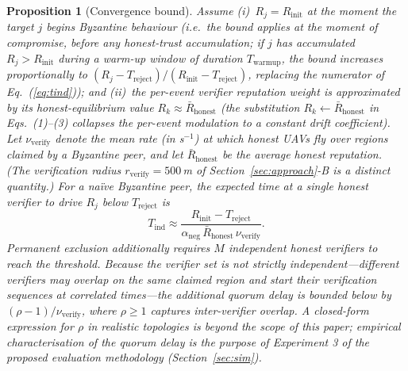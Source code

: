 \documentclass[conference,10pt]{IEEEtran}
\newtheorem{proposition}{Proposition}
\begin{document}
\begin{proposition}[Convergence bound]
\label{prop:conv}
Assume (i)~$R_j = R_\text{init}$ at the moment the target $j$ begins Byzantine behaviour (i.e.\ the bound applies at the moment of compromise, before any honest-trust accumulation; if $j$ has accumulated $R_j > R_\text{init}$ during a warm-up window of duration $T_\text{warmup}$, the bound increases proportionally to $(R_j - T_\text{reject})/(R_\text{init} - T_\text{reject})$, replacing the numerator of Eq.~(\ref{eq:tind})); and (ii)~the per-event verifier reputation weight is approximated by its honest-equilibrium value $R_k \approx \bar{R}_\text{honest}$ (the substitution $R_k \leftarrow \bar{R}_\text{honest}$ in Eqs.~(1)--(3) collapses the per-event modulation to a constant drift coefficient). Let $\nu_\text{verify}$ denote the mean rate (in s$^{-1}$) at which honest UAVs fly over regions claimed by a Byzantine peer, and let $\bar{R}_\text{honest}$ be the average honest reputation. (The verification \emph{radius} $r_\text{verify}=500$\,m of Section~\ref{sec:approach}-B is a distinct quantity.) For a na\"ive Byzantine peer, the expected time at a single honest verifier to drive $R_j$ below $T_\text{reject}$ is
\begin{equation}
T_\text{ind} \approx \frac{R_\text{init} - T_\text{reject}}{\alpha_\text{neg}\, \bar{R}_\text{honest}\, \nu_\text{verify}}.
\label{eq:tind}
\end{equation}
Permanent exclusion additionally requires $M$ independent honest verifiers to reach the threshold. Because the verifier set is not strictly independent---different verifiers may overlap on the same claimed region and start their verification sequences at correlated times---the additional quorum delay is bounded below by $(\rho-1)/\nu_\text{verify}$, where $\rho\geq 1$ captures inter-verifier overlap. A closed-form expression for $\rho$ in realistic topologies is beyond the scope of this paper; empirical characterisation of the quorum delay is the purpose of Experiment 3 of the proposed evaluation methodology (Section~\ref{sec:sim}).
\end{proposition}
\end{document}
